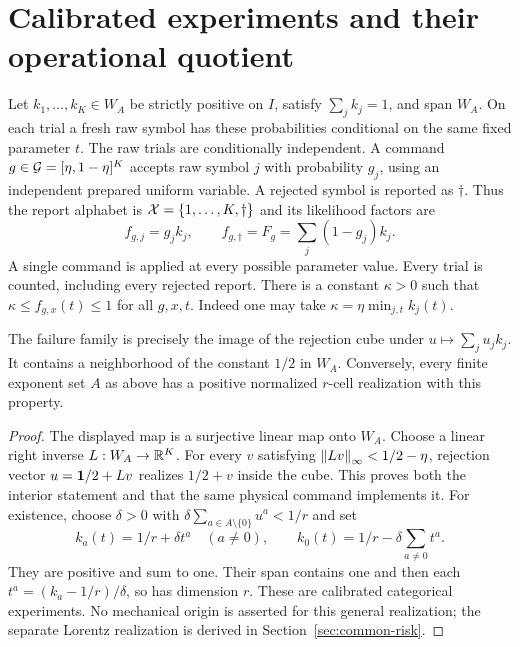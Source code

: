 \section{Calibrated experiments and their operational quotient}\label{sec:experiment}
Let $k_1,\ldots,k_K\in W_A$ be strictly positive on $I$, satisfy
$\sum_jk_j=1$, and span $W_A$. On each trial a fresh raw symbol has these
probabilities conditional on the same fixed parameter $t$. The raw trials
are conditionally independent. A command
$g\in\mathcal G=[\eta,1-\eta]^K$ accepts raw symbol $j$ with probability $g_j$,
using an independent prepared uniform variable. A rejected symbol is
reported as $\dagger$. Thus the report alphabet is
$\mathcal X=\{1,\ldots,K,\dagger\}$ and its likelihood factors are
\begin{equation}\label{eq:channel}
 f_{g,j}=g_jk_j,\qquad
 f_{g,\dagger}=F_g=\sum_j(1-g_j)k_j.
\end{equation}
A single command is applied at every possible parameter value. Every
trial is counted, including every rejected report. There is a constant
$\kappa>0$ such that $\kappa\le f_{g,x}(t)\le1$ for all $g,x,t$.
Indeed one may take $\kappa=\eta\min_{j,t}k_j(t)$.

\begin{lemma}\label{lem:interior}
The failure family is precisely the image of the rejection cube under
$u\mapsto\sum_ju_jk_j$. It contains a neighborhood of the constant $1/2$
in $W_A$. Conversely, every finite exponent set $A$ as above has a positive
normalized $r$-cell realization with this property.
\end{lemma}
\begin{proof}
The displayed map is a surjective linear map onto $W_A$. Choose a linear
right inverse $L:W_A\to\mathbb R^K$. For every $v$ satisfying
$\left\lVert Lv\right\rVert_\infty<1/2-\eta$, rejection vector
$u=\mathbf 1/2+Lv$ realizes $1/2+v$ inside the cube. This proves both the
interior statement and that the same physical command implements it.
For existence, choose $\delta>0$ with
$\delta\sum_{a\in A\setminus\{0\}}u^a<1/r$ and set
\[
 k_a(t)=1/r+\delta t^a\quad(a\ne0),\qquad
 k_0(t)=1/r-\delta\sum_{a\ne0}t^a.
\]
They are positive and sum to one. Their span contains one and then each
$t^a=(k_a-1/r)/\delta$, so has dimension $r$. These are calibrated
categorical experiments. No mechanical origin is asserted for this general
realization; the separate Lorentz realization is derived in
Section~\ref{sec:common-risk}.
\end{proof}

